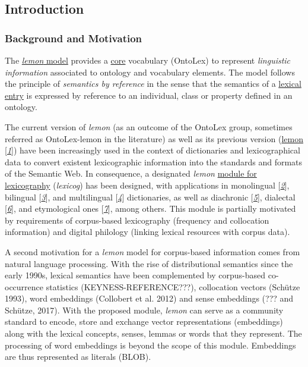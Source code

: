 \documentclass[a4paper]{article}
\newcommand\textstyleEmphasis[1]{\textit{#1}}
\newcommand\textstyleInternetlink[1]{\textcolor[rgb]{0.0,0.0,0.5019608}{#1}}
\newcommand\textstyleCitation[1]{\textit{#1}}
\begin{document}
\subsection{Introduction}
\subsubsection{Background and Motivation }
The \href{https://www.w3.org/2016/05/ontolex/}{\textstyleEmphasis{lemon}}\href{https://www.w3.org/2016/05/ontolex/}{\textstyleInternetlink{ model}} provides a \href{https://www.w3.org/2016/05/ontolex/#core}{\textstyleInternetlink{core}} vocabulary (OntoLex) to represent \textstyleEmphasis{linguistic information} associated to ontology and vocabulary elements. The model follows the principle of \textstyleEmphasis{semantics by reference} in the sense that the semantics of a \href{https://www.w3.org/2016/05/ontolex/#LexicalEntry}{\textstyleInternetlink{lexical entry}} is expressed by reference to an individual, class or property defined in an ontology. 

The current version of \textstyleEmphasis{lemon} (as an outcome of the OntoLex group, sometimes referred as OntoLex-lemon in the literature) as well as its previous version (\href{https://lemon-model.net/}{\textstyleInternetlink{lemon}} [\hyperlink{biblemonpaper}{\textstyleCitation{1}}]) have been increasingly used in the context of dictionaries and lexicographical data to convert existent lexicographic information into the standards and formats of the Semantic Web. In consequence, a designated \textstyleEmphasis{lemon} \href{../../}{\textstyleInternetlink{module for lexicography}} (\textstyleEmphasis{lexicog}) has been designed, with applications in monolingual [\hyperlink{bibklimekkdict}{\textstyleCitation{2}}], bilingual [\hyperlink{bibgraciaapertium}{\textstyleCitation{3}}], and multilingual [\hyperlink{bibbosquekdict}{\textstyleCitation{4}}] dictionaries, as well as diachronic [\hyperlink{bibkahndiachronic}{\textstyleCitation{5}}], dialectal [\hyperlink{bibdeclerckdialectal}{\textstyleCitation{6}}], and etymological ones [\hyperlink{bibabromeitetymological}{\textstyleCitation{7}}], among others. This module is partially motivated by requirements of corpus-based lexicography (frequency and collocation information) and digital philology (linking lexical resources with corpus data).

A second motivation for a \textstyleEmphasis{lemon} model for corpus-based information comes from natural language processing. With the rise of distributional semantics since the early 1990s, lexical semantics have been complemented by corpus-based co-occurrence statistics (KEYNESS-REFERENCE???), collocation vectors (Schütze 1993), word embeddings (Collobert et al. 2012) and sense embeddings (??? and Schütze, 2017). With the proposed module, \textstyleEmphasis{lemon} can serve as a community standard to encode, store and exchange vector representations (embeddings) along with the lexical concepts, senses, lemmas or words that they represent. The processing of word embeddings is beyond the scope of this module. Embeddings are thus represented as literals ({\textquotedbl}BLOB{\textquotedbl}).
\end{document}
